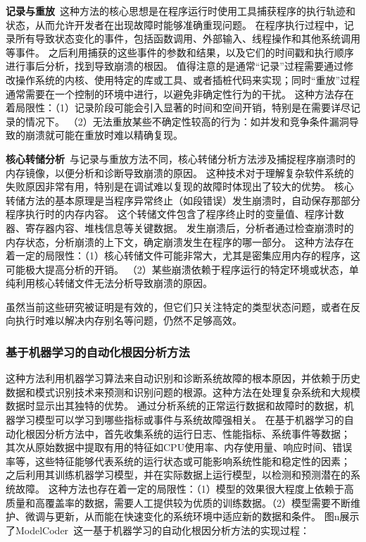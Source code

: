 \textbf{记录与重放}\ 这种方法的核心思想是在程序运行时使用工具捕获程序的执行轨迹和状态，从而允许开发者在出现故障时能够准确重现问题。
在程序执行过程中，记录所有导致状态变化的事件，包括函数调用、外部输入、线程操作和其他系统调用等事件。
之后利用捕获的这些事件的参数和结果，以及它们的时间戳和执行顺序进行事后分析，找到导致崩溃的根因。
值得注意的是通常“记录”过程需要通过修改操作系统的内核、使用特定的库或工具、或者插桩代码来实现；同时“重放”过程通常需要在一个控制的环境中进行，以避免非确定性行为的干扰。
这种方法存在着局限性：（1）记录阶段可能会引入显著的时间和空间开销，特别是在需要详尽记录的情况下。
（2）无法重放某些不确定性较高的行为：如并发和竞争条件漏洞导致的崩溃就可能在重放时难以精确复现。

\textbf{核心转储分析}\ 与记录与重放方法不同，核心转储分析方法涉及捕捉程序崩溃时的内存镜像，以便分析和诊断导致崩溃的原因。
这种技术对于理解复杂软件系统的失败原因非常有用，特别是在调试难以复现的故障时体现出了较大的优势。
核心转储方法的基本原理是当程序异常终止（如段错误）发生崩溃时，自动保存那部分程序执行时的内存内容。
这个转储文件包含了程序终止时的变量值、程序计数器、寄存器内容、堆栈信息等关键数据。
发生崩溃后，分析者通过检查崩溃时的内存状态，分析崩溃的上下文，确定崩溃发生在程序的哪一部分。
这种方法存在着一定的局限性：（1）核心转储文件可能非常大，尤其是密集应用内存的程序，这可能极大提高分析的开销。
（2）某些崩溃依赖于程序运行的特定环境或状态，单纯利用核心转储文件无法分析导致崩溃的原因。


虽然当前这些研究被证明是有效的，但它们只关注特定的类型状态问题，或者在反向执行时难以解决内存别名等问题，仍然不足够高效。
\subsubsection{基于机器学习的自动化根因分析方法}
这种方法利用机器学习算法来自动识别和诊断系统故障的根本原因，并依赖于历史数据和模式识别技术来预测和识别问题的根源。这种方法在处理复杂系统和大规模数据时显示出其独特的优势。
通过分析系统的正常运行数据和故障时的数据，机器学习模型可以学习到哪些指标或事件与系统故障强相关。
在基于机器学习的自动化根因分析方法中，首先收集系统的运行日志、性能指标、系统事件等数据；
其次从原始数据中提取有用的特征如CPU使用率、内存使用量、响应时间、错误率等，这些特征能够代表系统的运行状态或可能影响系统性能和稳定性的因素；
之后利用其训练机器学习模型，并在实际数据上运行模型，以检测和预测潜在的系统故障。
这种方法也存在着一定的局限性：（1）模型的效果很大程度上依赖于高质量和高覆盖率的数据，需要人工提供较为优质的训练数据。（2）模型需要不断维护、微调与更新，从而能在快速变化的系统环境中适应新的数据和条件。
图n展示了ModelCoder~\cite{9521318}这一基于机器学习的自动化根因分析方法的实现过程：

